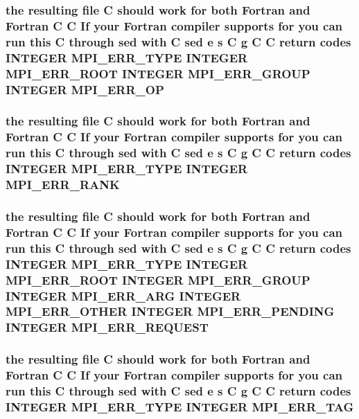 \subsubsection{\setlength{\rightskip}{0pt plus 5cm}the resulting file C should {\bf work} for both Fortran and Fortran C C If your Fortran compiler supports for you can run this C through sed {\bf with} C sed e s C g C C return codes INTEGER MPI\_\-ERR\_\-TYPE INTEGER MPI\_\-ERR\_\-ROOT INTEGER MPI\_\-ERR\_\-GROUP INTEGER {\bf MPI\_\-ERR\_\-OP}}\label{mpif_8h_91fe235f16eb11cde40b4d32fe0afbbb}


\subsubsection{\setlength{\rightskip}{0pt plus 5cm}the resulting file C should {\bf work} for both Fortran and Fortran C C If your Fortran compiler supports for you can run this C through sed {\bf with} C sed e s C g C C return codes INTEGER MPI\_\-ERR\_\-TYPE INTEGER {\bf MPI\_\-ERR\_\-RANK}}\label{mpif_8h_1fa7e45fa5dafd762bca87ad054806de}


\subsubsection{\setlength{\rightskip}{0pt plus 5cm}the resulting file C should {\bf work} for both Fortran and Fortran C C If your Fortran compiler supports for you can run this C through sed {\bf with} C sed e s C g C C return codes INTEGER MPI\_\-ERR\_\-TYPE INTEGER MPI\_\-ERR\_\-ROOT INTEGER MPI\_\-ERR\_\-GROUP INTEGER MPI\_\-ERR\_\-ARG INTEGER MPI\_\-ERR\_\-OTHER INTEGER MPI\_\-ERR\_\-PENDING INTEGER {\bf MPI\_\-ERR\_\-REQUEST}}\label{mpif_8h_d4cc17b60cd977109d51bd3d832440da}


\subsubsection{\setlength{\rightskip}{0pt plus 5cm}the resulting file C should {\bf work} for both Fortran and Fortran C C If your Fortran compiler supports for you can run this C through sed {\bf with} C sed e s C g C C return codes INTEGER MPI\_\-ERR\_\-TYPE INTEGER {\bf MPI\_\-ERR\_\-TAG}}\label{mpif_8h_416a50cabec27a3a4d4ee1d3f76be817}


